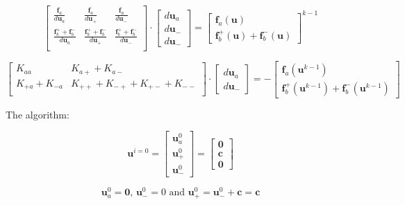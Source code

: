 \documentclass[3p]{elsarticle}
\begin{document}
\begin{equation}
\begin{bmatrix}
\frac{\bm{f}_a}{d\bm{u}_a} & \frac{\bm{f}_a}{d\bm{u}_+} & \frac{\bm{f}_a}{d\bm{u}_-}\\
\frac{\bm{f}_b^+ + \bm{f}_b^-}{d\bm{u}_a} & \frac{\bm{f}_b^+ + \bm{f}_b^-}{d\bm{u}_+} & \frac{\bm{f}_b^+ + \bm{f}_b^-}{d\bm{u}_-}\\
\end{bmatrix}
\cdot
\begin{bmatrix}d\bm{u}_a \\ d\bm{u}_- \\ d\bm{u}_-\end{bmatrix}
=
\begin{bmatrix}
\bm{f}_a(\bm{u}) \\
\bm{f}_b^+(\bm{u}) + \bm{f}_b^-(\bm{u})
\end{bmatrix}^{k-1}
\end{equation}

\begin{equation}
\begin{bmatrix}
K_{aa}          & K_{a+} + K_{a-} \\
K_{+a} + K_{-a} & K_{++} + K_{-+}  + K_{+-} + K_{--} \\
\end{bmatrix}
\cdot
\begin{bmatrix}d\bm{u}_a \\ d\bm{u}_- \end{bmatrix}
=
-\begin{bmatrix}\bm{f}_a(\bm{u}^{k-1}) \\ \bm{f}_b^+(\bm{u}^{k-1}) + \bm{f}_b^-(\bm{u}^{k-1}) \end{bmatrix}
\end{equation}


The algorithm:

\begin{equation}
\bm{u}^{i=0} = \begin{bmatrix}\bm{u}_a^{0} \\ \bm{u}_+^{0} \\ \bm{u}_-^{0}\end{bmatrix} = \begin{bmatrix}\bm{0} \\ \bm{c} \\ \bm{0}\end{bmatrix}
\end{equation}

\begin{equation}
\bm{u}_a^{0} = \bm{0}, \, \bm{u}_-^{0} = 0 \text{ and } \bm{u}_+^{0} = \bm{u}_-^{0} + \bm{c} = \bm{c}
\end{equation}
\end{document}
